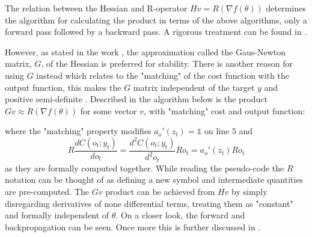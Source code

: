 The relation between the Hessian and R-operator $Hv = R(\nabla f(\theta))$ determines the algorithm for calculating the product in terms of the above algorithms, only a forward pass followed by a backward pass. A rigorous treatment can be found in \cite{suts}.

However, as stated in the work \cite{suts}, the approximation called the Gaus-Newton matrix, \(G\), of the Hessian is preferred for stability. There is another reason for using $G$ instead which relates to the "matching" of the cost function with the output function, this makes the $G$ matrix independent of the target $y$ and positive semi-definite \cite{Martens2012}. Described in the algorithm below is the product \(Gv \approx R(\nabla f(\theta))\) for some vector $v$, with "matching" cost and output function:

\begin{algorithmic}[1]
    \EndFor
    \EndFor
    \State {}
\end{algorithmic}

\noindent
where the "matching" property modifies $a_o'(z_t) = \mathds{1}$ on line $5$ and \[R\frac{dC(o_t; y_t)}{d o_t} = \frac{d^2C(o_t; y_t)}{d^2o_t} Ro_t =  a_o'(z_t)  Ro_t\] as they are formally computed together. While reading the pseudo-code the $R$ notation can be thought of as defining a new symbol and intermediate quantities are pre-computed. The $Gv$ product can be achieved from $Hv$ by simply disregarding derivatives of none differential terms, treating them as "constant" and formally independent of $\theta$. On a closer look, the forward and backpropagation can be seen. Once more this is further discussed in \cite{suts}.

